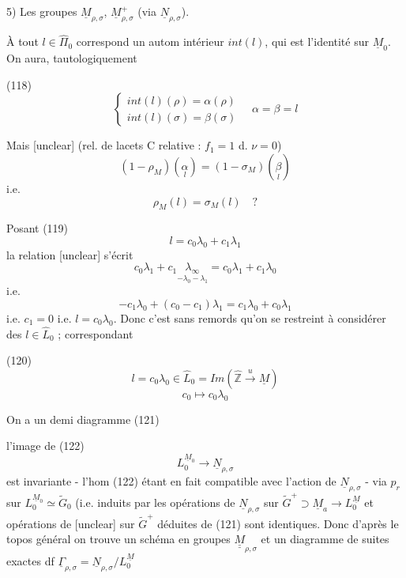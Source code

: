 \newpage


5) Les groupes $\underline{M}_{\rho,\sigma}$, $\underline{M}_{\rho,\sigma}^+$ (via $\underline{N}_{\rho,\sigma}$).

À tout $l \in \hat{\Pi}_0$ correspond un autom
intérieur $int(l)$, qui est l'identité sur
$\underline{M}_0$. On aura, tautologiquement

(118) $$ \begin{cases} int(l)(\rho) = \alpha(\rho) \\ int(l)(\sigma) = \beta(\sigma) \end{cases} \quad \alpha = \beta = l $$

Mais [unclear] (rel. de lacets C relative : $f_1=1$ d. $\nu=0$)
$$ (1-\rho_M)(\underset{l}{\alpha}) = (1-\sigma_M)(\underset{l}{\beta}) $$
i.e.
$$ \rho_M(l) = \sigma_M(l) \quad ? $$

Posant 
(119) $$ l = c_0 \lambda_0 + c_1 \lambda_1 $$
la relation [unclear] s'écrit
$$ c_0 \lambda_1 + c_1 \underset{-\lambda_0-\lambda_1}{\lambda_\infty} = c_0 \lambda_1 + c_1 \lambda_0 $$
i.e.
$$ - c_1 \lambda_0 + (c_0 - c_1) \lambda_1 = c_1 \lambda_0 + c_0 \lambda_1 $$
i.e. $c_1=0$ i.e. $l = c_0 \lambda_0$. Donc c'est
sans remords qu'on se restreint à
considérer des $l \in \widehat{L}_0$ ; correspondant

(120) $$ l = c_0 \lambda_0 \in \widehat{L}_0 = Im (\hat{\mathbb{Z}} \xrightarrow{u} \underline{M}) $$
$$ c_0 \mapsto c_0 \lambda_0 $$

On a un demi diagramme
(121) 

\newpage


l'image de
(122) $$L_0^{\underline{M}_0} \to \underline{N}_{\rho,\sigma}$$
est invariante - l'hom (122) étant en
fait compatible avec l'action de $\underline{N}_{\rho,\sigma}$
- via $p_r$ sur $L_0^{\underline{M}_0} \simeq \tilde{G}_0$ (i.e. induits
par les opérations de $\underline{N}_{\rho,\sigma}$ sur $\tilde{G}^+ \supset \underline{M}_a \to L_0^{\underline{M}}$
et opérations de [unclear] sur $\tilde{G}^+$ déduites
de (121) sont identiques. Donc d'après
le topos général on trouve un
schéma en groupes $\underline{\underline{M}}_{\rho,\sigma}$ et un
diagramme de suites exactes df $\underline{\Gamma}_{\rho,\sigma} = \underline{N}_{\rho,\sigma}/L_0^{\underline{M}}$

